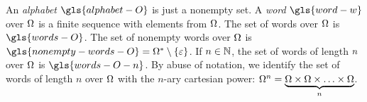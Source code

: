 
An \emph{alphabet} $\gls{alphabet-O}$ is just a nonempty set.
A \emph{word} $\gls{word-w}$ over $\Omega$ is a finite sequence with elements
from $\Omega$. The set of words over $\Omega$ is $\gls{words-O}$.
The set of nonempty words over $\Omega$ is $\gls{nonempty-words-O} =
\Words\alphO \sub \set{\eword}$.
If $n \in \mathbb{N}$, the set of words of length $n$ over $\Omega$ is
$\gls{words-O-n}$.
By abuse of notation, we identify the set of words of length $n$ over
$\Omega$ with the $n$-ary cartesian power: $\alphO^n =
\underbrace{\alphO\cprod\alphO\cprod\dots\cprod\alphO}_{n}$.
